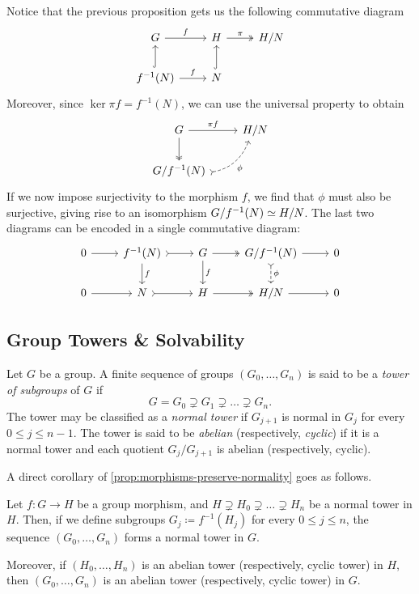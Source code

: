 Notice that the previous proposition gets us the following commutative diagram
\[
  \begin{tikzcd}
    G \ar[r, "f"] &H \ar[r, two heads, "\pi"] &H/N \\
    f^{-1}(N) \ar[u, hook] \ar[r, "f"] &N \ar[u, hook]
  \end{tikzcd}
\]
Moreover, since \(\ker \pi f = f^{-1}(N)\), we can use the universal property to
obtain
\[
  \begin{tikzcd}
    G \ar[d, two heads] \ar[r, "\pi f"] &H/N \\
    G/f^{-1}(N) \ar[ru, swap, tail, bend right, dashed, "\phi"] &
  \end{tikzcd}
\]
If we now impose surjectivity to the morphism \(f\), we find that \(\phi\) must
also be surjective, giving rise to an isomorphism \(G/f^{-1}(N) \simeq H/N\). The
last two diagrams can be encoded in a single commutative diagram:
\[
  \begin{tikzcd}
    0 \ar[r]
    &f^{-1}(N) \ar[d, "f"] \ar[r, tail]
    &G \ar[d, "f"] \ar[r, two heads]
    &G/f^{-1}(N) \ar[r] \ar[d, dashed, tail, "\phi"]
    &0 \\
    0 \ar[r]
    &N \ar[r, tail]
    &H \ar[r, two heads]
    &H/N \ar[r]
    &0
  \end{tikzcd}
\]

\subsection{Group Towers \& Solvability}

\begin{definition}
\label{def:tower-subgroups}
Let \(G\) be a group. A finite sequence of groups \((G_0, \dots, G_n)\) is said
to be a \emph{tower of subgroups} of \(G\) if
\[
  G = G_0 \supsetneq G_1 \supsetneq \dots \supsetneq G_n.
\]
The tower may be classified as a \emph{normal tower} if \(G_{j + 1}\) is normal
in \(G_j\) for every \(0 \leq j \leq n - 1\). The tower is said to be
\emph{abelian} (respectively, \emph{cyclic}) if it is a normal tower and each
quotient \(G_j/G_{j+1}\) is abelian (respectively, cyclic).
\end{definition}

A direct corollary of \cref{prop:morphisms-preserve-normality} goes as follows.

\begin{corollary}
\label{cor:morphism-normal-towers}
Let \(f: G \to H\) be a group morphism, and \(H \supsetneq H_0 \supsetneq \dots
\supsetneq H_n\) be a normal tower in \(H\). Then, if we define subgroups \(G_j
\coloneq f^{-1}(H_j)\) for every \(0 \leq j \leq n\), the sequence \((G_0,
\dots, G_n)\) forms a normal tower in \(G\).

Moreover, if \((H_0, \dots, H_n)\) is an abelian tower (respectively, cyclic
tower) in \(H\), then \((G_0, \dots, G_n)\) is an abelian tower (respectively,
cyclic tower) in \(G\).
\end{corollary}

